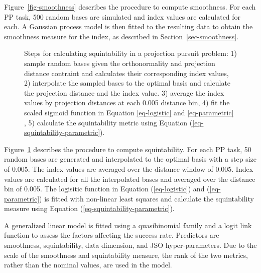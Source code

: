 \documentclass[
  12pt,
]{interact}
\theoremstyle{plain}
\begin{document}
Figure~\ref{fig-smoothness} describes the procedure to compute
smoothness. For each PP task, 500 random bases are simulated and index
values are calculated for each. A Gaussian process model is then fitted
to the resulting data to obtain the smoothness measure for the index, as
described in Section~\ref{sec-smoothness}.

\begin{figure}


\caption{\label{fig-squintability}Steps for calculating squintability in
a projection pursuit problem: 1) sample random bases given the
orthonormality and projection distance contraint and calculates their
corresponding index values, 2) interpolate the sampled bases to the
optimal basis and calculate the projection distance and the index value.
3) average the index values by projection distances at each 0.005
distance bin, 4) fit the scaled sigmoid function in Equation
\eqref{eq-logistic} and \eqref{eq-parametric} , 5) calculate the
squintability metric using Equation
(\ref{eq-squintability-parametric}).}

\end{figure}%

Figure~\ref{fig-squintability} describes the procedure to compute
squintability. For each PP task, 50 random bases are generated and
interpolated to the optimal basis with a step size of 0.005. The index
values are averaged over the distance window of 0.005. Index values are
calculated for all the interpolated bases and averaged over the distance
bin of 0.005. The logisitic function in Equation (\ref{eq-logistic}) and
(\ref{eq-parametric}) is fitted with non-linear least squares and
calculate the squintability measure using Equation
(\ref{eq-squintability-parametric}).

A generalized linear model is fitted using a quasibinomial family and a
logit link function to assess the factors affecting the success rate.
Predictors are smoothness, squintability, data dimension, and JSO
hyper-parameters. Due to the scale of the smoothness and squintability
measure, the rank of the two metrics, rather than the nominal values,
are used in the model.
\end{document}

